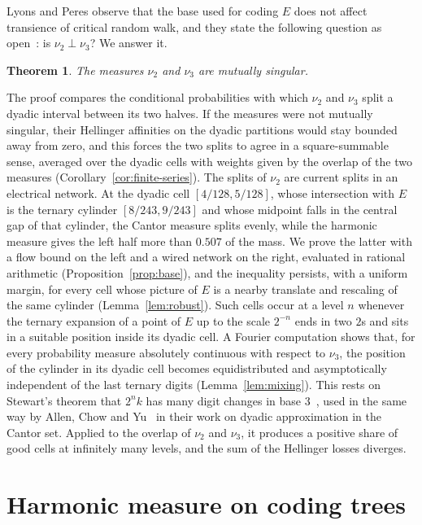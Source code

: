 \documentclass[11pt]{amsart}
\newtheorem{theorem}{Theorem}[section]
\theoremstyle{remark}
\begin{document}
Lyons and Peres observe that the base used for coding $E$ does not affect transience of critical random walk, and they state the following question as open~\cite[Question~16.7, p.~542]{LP}: is $\nu_2\perp\nu_3$? We answer it.

\begin{theorem}\label{thm:main}
The measures $\nu_2$ and $\nu_3$ are mutually singular.
\end{theorem}

The proof compares the conditional probabilities with which $\nu_2$ and $\nu_3$ split a dyadic interval between its two halves. If the measures were not mutually singular, their Hellinger affinities on the dyadic partitions would stay bounded away from zero, and this forces the two splits to agree in a square-summable sense, averaged over the dyadic cells with weights given by the overlap of the two measures (Corollary~\ref{cor:finite-series}). The splits of $\nu_2$ are current splits in an electrical network. At the dyadic cell $[4/128,5/128]$, whose intersection with $E$ is the ternary cylinder $[8/243,9/243]$ and whose midpoint falls in the central gap of that cylinder, the Cantor measure splits evenly, while the harmonic measure gives the left half more than $0.507$ of the mass. We prove the latter with a flow bound on the left and a wired network on the right, evaluated in rational arithmetic (Proposition~\ref{prop:base}), and the inequality persists, with a uniform margin, for every cell whose picture of $E$ is a nearby translate and rescaling of the same cylinder (Lemma~\ref{lem:robust}). Such cells occur at a level $n$ whenever the ternary expansion of a point of $E$ up to the scale $2^{-n}$ ends in two $2$s and sits in a suitable position inside its dyadic cell. A Fourier computation shows that, for every probability measure absolutely continuous with respect to $\nu_3$, the position of the cylinder in its dyadic cell becomes equidistributed and asymptotically independent of the last ternary digits (Lemma~\ref{lem:mixing}). This rests on Stewart's theorem that $2^{n}k$ has many digit changes in base $3$~\cite{Stewart}, used in the same way by Allen, Chow and Yu~\cite{ACY} in their work on dyadic approximation in the Cantor set. Applied to the overlap of $\nu_2$ and $\nu_3$, it produces a positive share of good cells at infinitely many levels, and the sum of the Hellinger losses diverges.

\section{Harmonic measure on coding trees}\label{sec:prelim}
\end{document}
